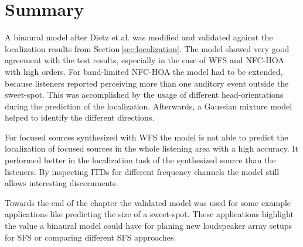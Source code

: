 \section{Summary}
\label{sec:modelling_summary}
%
A binaural model after Dietz et al.\autocite{Dietz2011} was modified and
validated against the localization results from Section\,\ref{sec:localization}.
The model showed very good agreement with the test results, especially in the
case of \ac{WFS} and \ac{NFC-HOA} with high orders. For band-limited \ac{NFC-HOA}
the model had to be extended, because listeners reported perceiving more than
one auditory event outside the sweet-spot. This was accomplished by the
usage of different head-orientations during the prediction of the localization.
Afterwards, a Gaussian mixture model helped to identify the different directions.

For focused sources synthesized with \ac{WFS} the model is not able
to predict the localization of focused sources in the whole listening area with
a high accuracy. It performed better in the localization task of
the synthesized source than the listeners.
By inspecting \acp{ITD} for different frequency channels the model still allows
interesting discernments.

Towards the end of the chapter the validated model was used for some example
applications like predicting the size of a sweet-spot. These applications
highlight the value a binaural model could have for planing new loudspeaker array
setups for \ac{SFS} or comparing different \ac{SFS} approaches.
